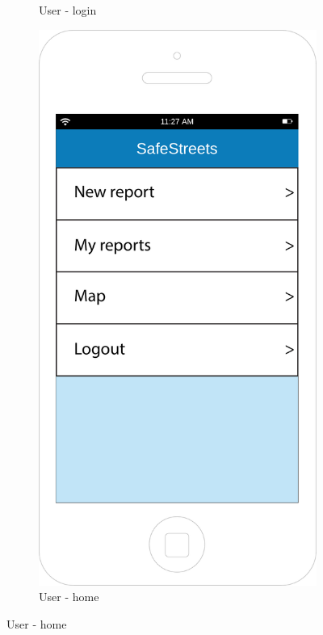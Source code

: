 \documentclass[12pt,a4paper]{report}
\begin{document}
\begin{figure}[H]
\begin{subfigure}{0.5\textwidth}
			\caption{User - login}
			\label{Login}
		\end{subfigure}
		\begin{subfigure}{0.5\textwidth}
			\includegraphics[scale=0.25, center]{Home}
			\caption{User - home}
			\label{Home}
		\end{subfigure}
		\end{figure}
\end{document}
